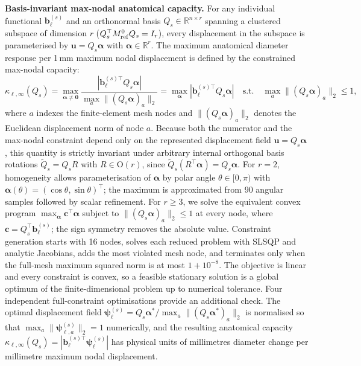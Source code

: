 \documentclass[pdflatex,sn-basic]{sn-jnl}
\begin{document}
\noindent\textbf{Basis-invariant max-nodal anatomical capacity.}
For any individual functional $\mathbf b_\ell^{(s)}$ and an orthonormal basis $Q_s \in \mathbb R^{n \times r}$ spanning a clustered subspace of dimension $r$ ($Q_s^\top M_{\rm ref}^0 Q_s = I_r$), every displacement in the subspace is parameterised by $\mathbf u = Q_s \boldsymbol\alpha$ with $\boldsymbol\alpha \in \mathbb R^r$.
The maximum anatomical diameter response per 1\,mm maximum nodal displacement is defined by the constrained max-nodal capacity:
\begin{equation}
\kappa_{\ell,\infty}(Q_s) = \max_{\boldsymbol\alpha \ne \mathbf 0} \frac{|\mathbf b_\ell^{(s)\top} Q_s \boldsymbol\alpha|}{\max_a \|(Q_s \boldsymbol\alpha)_a\|_2} = \max_{\boldsymbol\alpha} |\mathbf b_\ell^{(s)\top} Q_s \boldsymbol\alpha| \quad \text{s.t.} \quad \max_a \|(Q_s \boldsymbol\alpha)_a\|_2 \le 1,
\label{eq:single-functional-max-nodal}
\end{equation}
where $a$ indexes the finite-element mesh nodes and $\|(Q_s \boldsymbol\alpha)_a\|_2$ denotes the Euclidean displacement norm of node $a$.
Because both the numerator and the max-nodal constraint depend only on the represented displacement field $\mathbf u = Q_s \boldsymbol\alpha$, this quantity is strictly invariant under arbitrary internal orthogonal basis rotations $\widetilde Q_s = Q_s R$ with $R \in \mathrm O(r)$, since $\widetilde Q_s (R^\top \boldsymbol\alpha) = Q_s \boldsymbol\alpha$.
For $r=2$, homogeneity allows parameterisation of $\boldsymbol\alpha$ by polar angle $\theta\in[0,\pi)$ with $\boldsymbol\alpha(\theta)=(\cos\theta,\sin\theta)^\top$; the maximum is approximated from 90 angular samples followed by scalar refinement. For $r\ge3$, we solve the equivalent convex program $\max_{\boldsymbol\alpha} \mathbf c^\top\boldsymbol\alpha$ subject to $\|(Q_s\boldsymbol\alpha)_a\|_2\le1$ at every node, where $\mathbf c=Q_s^\top\mathbf b_\ell^{(s)}$; the sign symmetry removes the absolute value. Constraint generation starts with 16 nodes, solves each reduced problem with SLSQP and analytic Jacobians, adds the most violated mesh node, and terminates only when the full-mesh maximum squared norm is at most $1+10^{-8}$. The objective is linear and every constraint is convex, so a feasible stationary solution is a global optimum of the finite-dimensional problem up to numerical tolerance. Four independent full-constraint optimisations provide an additional check.
The optimal displacement field $\boldsymbol\psi_\ell^{(s)} = Q_s \boldsymbol\alpha^* / \max_a \|(Q_s \boldsymbol\alpha^*)_a\|_2$ is normalised so that $\max_a \|\boldsymbol\psi_{\ell,a}^{(s)}\|_2 = 1$ numerically, and the resulting anatomical capacity $\kappa_{\ell,\infty}(Q_s) = |\mathbf b_\ell^{(s)\top}\boldsymbol\psi_\ell^{(s)}|$ has physical units of millimetres diameter change per millimetre maximum nodal displacement.
\end{document}

